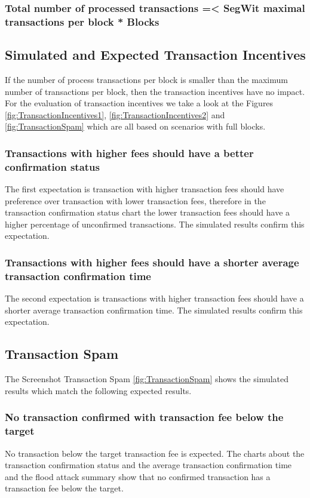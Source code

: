 \subsubsection{Total number of processed transactions =< SegWit maximal transactions per block * Blocks}

\subsection{Simulated and Expected Transaction Incentives}
If the number of process transactions per block is smaller than the maximum number of transactions per block, then the transaction incentives have no impact. For the evaluation of transaction incentives we take a look at the Figures \ref{fig:TransactionIncentives1}, \ref{fig:TransactionIncentives2} and \ref{fig:TransactionSpam} which are all based on scenarios with full blocks.

\subsubsection{Transactions with higher fees should have a better confirmation status}
The first expectation is transaction with higher transaction fees should have preference over transaction with lower transaction fees, therefore in the transaction confirmation status chart the lower transaction fees should have a higher percentage of unconfirmed transactions. The simulated results confirm this expectation.

\subsubsection{Transactions with higher fees should have a shorter average transaction confirmation time}
The second expectation is transactions with higher transaction fees should have a shorter average transaction confirmation time. The simulated results confirm this expectation.

\subsection{Transaction Spam}
The Screenshot Transaction Spam \ref{fig:TransactionSpam} shows the simulated results which match the following expected results.

\subsubsection{No transaction confirmed with transaction fee below the target}
No transaction below the target transaction fee is expected. The charts about the transaction confirmation status and the average transaction confirmation time and the flood attack summary show that no confirmed transaction has a transaction fee below the target.

